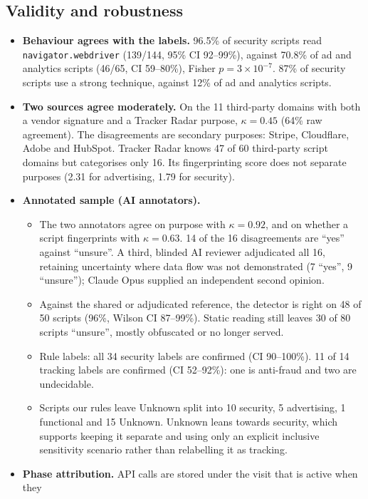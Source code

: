 \documentclass[sigconf,review,anonymous]{acmart}
\begin{document}
\subsection{Validity and robustness}\label{sec:robust}
\begin{itemize}
\item \textbf{Behaviour agrees with the labels.} 96.5\% of security scripts read
  \texttt{navigator.webdriver} (139/144, 95\% CI 92--99\%), against 70.8\% of ad and analytics
  scripts (46/65, CI 59--80\%), Fisher $p=3\times10^{-7}$. 87\% of security scripts use a strong
  technique, against 12\% of ad and analytics scripts.
\item \textbf{Two sources agree moderately.} On the 11 third-party domains with both a vendor
  signature and a Tracker Radar purpose, $\kappa=0.45$ (64\% raw agreement). The disagreements
  are secondary purposes: Stripe, Cloudflare, Adobe and HubSpot. Tracker Radar knows 47 of 60
  third-party script domains but categorises only 16. Its fingerprinting score does not separate
  purposes (2.31 for advertising, 1.79 for security).
\item \textbf{Annotated sample (AI annotators).}
  \begin{itemize}
  \item The two annotators agree on purpose with $\kappa=0.92$, and on whether a script
    fingerprints with $\kappa=0.63$. 14 of the 16 disagreements are ``yes'' against ``unsure''.
    A third, blinded AI reviewer adjudicated all 16, retaining uncertainty where data flow was
    not demonstrated (7 ``yes'', 9 ``unsure''); Claude Opus supplied an independent second opinion.
  \item Against the shared or adjudicated reference, the detector is right on 48 of 50 scripts
    (96\%, Wilson CI 87--99\%). Static reading still leaves 30 of 80 scripts ``unsure'', mostly
    obfuscated or no longer served.
  \item Rule labels: all 34 security labels are confirmed (CI 90--100\%). 11 of 14 tracking
    labels are confirmed (CI 52--92\%): one is anti-fraud and two are undecidable.
  \item Scripts our rules leave Unknown split into 10 security, 5 advertising, 1 functional and
    15 Unknown.
    Unknown leans towards security, which supports keeping it separate and using only an
    explicit inclusive sensitivity scenario rather than relabelling it as tracking.
  \end{itemize}
\item \textbf{Phase attribution.} API calls are stored under the visit that is active when they

\end{itemize}
\end{document}
